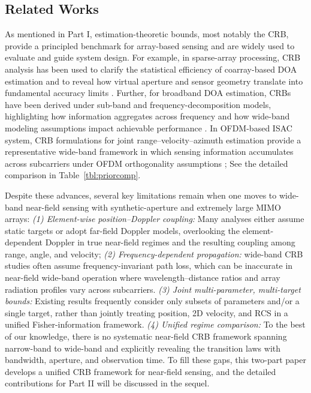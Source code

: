 \documentclass[9pt,final,journal,twocolumn]{IEEEtran}
\begin{document}
\subsection{Related Works}
\vspace{-0.1cm}

As mentioned in Part I, estimation-theoretic bounds, most notably the CRB, provide a principled benchmark for array-based sensing and are widely used to evaluate and guide system design. For example, in sparse-array processing, CRB analysis has been used to clarify the statistical efficiency of coarray-based DOA estimation and to reveal how virtual aperture and sensor geometry translate into fundamental accuracy limits \cite{wang2017coarrays}. Further, for broadband DOA estimation, CRBs have been derived under sub-band and frequency-decomposition models, highlighting how information aggregates across frequency and how wide-band modeling assumptions impact achievable performance \cite{liang2021CramerRao}. In OFDM-based ISAC system, CRB formulations for joint range–velocity–azimuth estimation provide a representative wide-band framework in which sensing information accumulates across subcarriers under OFDM orthogonality assumptions \cite{hu2024joint}; %
See the detailed comparison in Table~\ref{tbl:priorcomp}. 

Despite these advances, several key limitations remain when one moves to wide-band near-field sensing with synthetic-aperture and extremely large MIMO arrays: \textit{(1) Element-wise position–Doppler coupling:} Many analyses either assume static targets or adopt far-field Doppler models, overlooking the element-dependent Doppler in true near-field regimes and the resulting coupling among range, angle, and velocity; \textit{(2) Frequency-dependent propagation:} wide-band CRB studies often assume frequency-invariant path loss, which can be inaccurate in near-field wide-band operation where wavelength–distance ratios and array radiation profiles vary across subcarriers. \textit{(3) Joint multi-parameter, multi-target bounds:} Existing results frequently consider only subsets of parameters and/or a single target, rather than jointly treating position, 2D velocity, and RCS in a unified Fisher-information framework. \textit{(4) Unified regime comparison:} To the best of our knowledge, there is no systematic near-field CRB framework spanning narrow-band to wide-band and explicitly revealing the transition laws with bandwidth, aperture, and observation time. 
To fill these gaps, this two-part paper develops a unified CRB framework for near-field sensing, and the detailed contributions for Part II will be discussed in the sequel.
\end{document}
